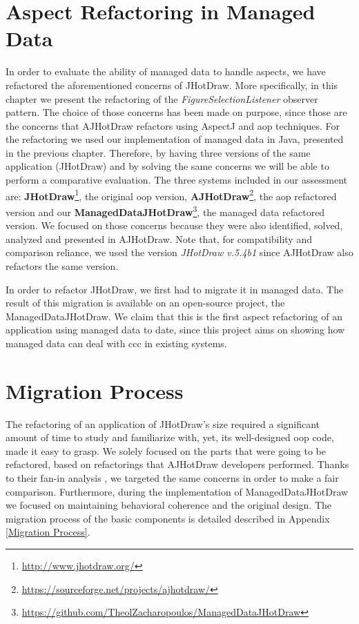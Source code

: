\section{Aspect Refactoring in Managed Data}
In order to evaluate the ability of managed data to handle aspects, we have refactored the aforementioned concerns of JHotDraw.
More specifically, in this chapter we present the refactoring of the \textit{FigureSelectionListener} observer pattern.
The choice of those concerns has been made on purpose, since those are the concerns that AJHotDraw refactors using AspectJ and \ac{aop} techniques.
For the refactoring we used our implementation of managed data in Java, presented in the previous chapter.
Therefore, by having three versions of the same application (JHotDraw) and by solving the same concerns we will be able to perform a comparative evaluation.
The three systems included in our assessment are: \textbf{JHotDraw}\footnote{\url{http://www.jhotdraw.org/}}, the original \ac{oop} version, \textbf{AJHotDraw}\footnote{\url{https://sourceforge.net/projects/ajhotdraw/}}, the \ac{aop} refactored version and our \textbf{ManagedDataJHotDraw}\footnote{\url{https://github.com/TheolZacharopoulos/ManagedDataJHotDraw}}, the managed data refactored version.
We focused on those concerns because they were also identified, solved, analyzed and presented in AJHotDraw.
Note that, for compatibility and comparison reliance, we used the version \textit{JHotDraw v.5.4b1} since AJHotDraw also refactors the same version.

In order to refactor JHotDraw, we first had to migrate it in managed data.
The result of this migration is available on an open-source project, the ManagedDataJHotDraw.
We claim that this is the first aspect refactoring of an application using managed data to date, since this project aims on showing how managed data can deal with \ac{ccc} in existing systems.

\section{Migration Process}\label{Migration}
The refactoring of an application of JHotDraw's size required a significant amount of time to study and familiarize with, yet, its well-designed \ac{oop} code, made it easy to grasp.
We solely focused on the parts that were going to be refactored, based on refactorings that AJHotDraw developers \cite{marinajhotdraw} performed.
Thanks to their fan-in analysis \cite{marin2004identifying}, we targeted the same concerns in order to make a fair comparison.
Furthermore, during the implementation of ManagedDataJHotDraw we focused on maintaining behavioral coherence and the original design.
The migration process of the basic components is detailed described in Appendix \ref{Migration Process}.

